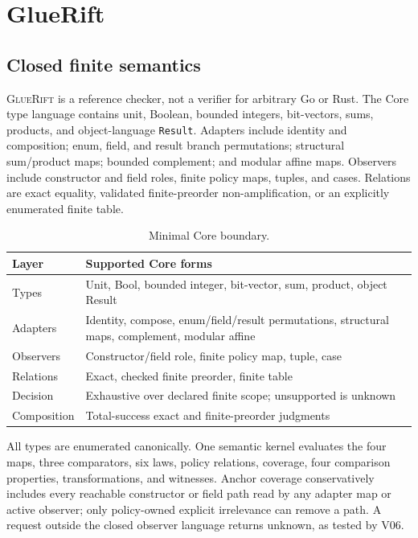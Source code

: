 \documentclass[sigconf,anonymous,review]{acmart}
\newcommand{\sys}{\textsc{GlueRift}\xspace}
\begin{document}
\section{GlueRift}
\label{sec:system}

\subsection{Closed finite semantics}

\sys is a reference checker, not a verifier for arbitrary Go or Rust.
The Core type language contains unit, Boolean, bounded integers,
bit-vectors, sums, products, and object-language \texttt{Result}.
Adapters include identity and composition; enum, field, and result
branch permutations; structural sum/product maps; bounded complement;
and modular affine maps.  Observers include constructor and field
roles, finite policy maps, tuples, and cases.  Relations are exact
equality, validated finite-preorder non-amplification, or an explicitly
enumerated finite table.

\begin{table}[t]
\caption{Minimal Core boundary.}
\label{tab:ir}
\centering
\scriptsize
\setlength{\tabcolsep}{3.5pt}
\begin{tabular}{p{}p{}}
\toprule
Layer & Supported Core forms\\
\midrule
Types & Unit, Bool, bounded integer, bit-vector, sum, product, object Result\\
Adapters & Identity, compose, enum/field/result permutations, structural maps, complement, modular affine\\
Observers & Constructor/field role, finite policy map, tuple, case\\
Relations & Exact, checked finite preorder, finite table\\
Decision & Exhaustive over declared finite scope; unsupported is unknown\\
Composition & Total-success exact and finite-preorder judgments\\
\bottomrule
\end{tabular}
\end{table}

All types are enumerated canonically.  One semantic kernel evaluates
the four maps, three comparators, six laws, policy relations, coverage,
four comparison properties, transformations, and witnesses.  Anchor
coverage conservatively includes every reachable constructor or field
path read by any adapter map or active observer; only policy-owned
explicit irrelevance can remove a path.  A request outside the closed
observer language returns \textsf{unknown}, as tested by V06.
\end{document}
